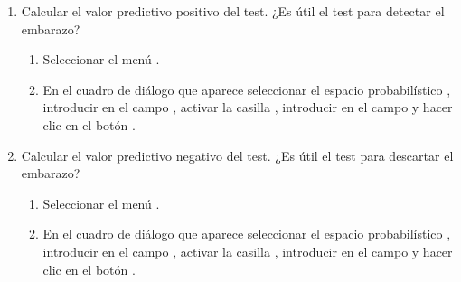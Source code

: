 \begin{enumerate}[leftmargin=*]
\begin{enumerate}
\item Calcular el valor predictivo positivo del test. 
¿Es útil el test para detectar el embarazo? 
\begin{indicacion}
\begin{enumerate}
\item Seleccionar el menú .
\item En el cuadro de diálogo que aparece seleccionar el espacio probabilístico , introducir
 en el campo , activar la casilla , introducir
 en el campo  y hacer clic en el botón .
\end{enumerate}
\end{indicacion} 

\item Calcular el valor predictivo negativo del test.
¿Es útil el test para descartar el embarazo?
\begin{indicacion}
\begin{enumerate}
\item Seleccionar el menú .
\item En el cuadro de diálogo que aparece seleccionar el espacio probabilístico , introducir
 en el campo , activar la casilla , introducir
 en el campo  y hacer clic en el botón .
\end{enumerate}
\end{indicacion} 
\end{enumerate} 

\end{enumerate}



